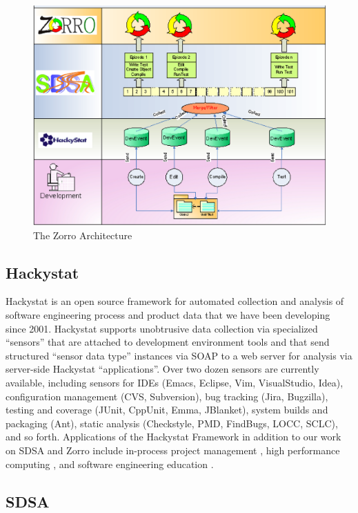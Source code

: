\documentclass[11pt,twocolumn]{article}
\begin{document}
\begin{figure}[th]
  \center
  \includegraphics[width=1.0\textwidth]{zorro-architecture.eps}
  \caption{The Zorro Architecture}
  \label{fig:ZorroArchitecture}
\end{figure} 

\subsection{Hackystat}

Hackystat is an open source framework for automated collection and analysis
of software engineering process and product data that we have been
developing since 2001. Hackystat supports unobtrusive data collection via
specialized ``sensors'' that are attached to development environment tools
and that send structured ``sensor data type'' instances via SOAP to a web
server for analysis via server-side Hackystat ``applications''. Over two
dozen sensors are currently available, including sensors for IDEs (Emacs,
Eclipse, Vim, VisualStudio, Idea), configuration management (CVS,
Subversion), bug tracking (Jira, Bugzilla), testing and coverage (JUnit,
CppUnit, Emma, JBlanket), system builds and packaging (Ant), static
analysis (Checkstyle, PMD, FindBugs, LOCC, SCLC), and so forth.
Applications of the Hackystat Framework in addition to our work on SDSA and
Zorro include in-process project management \cite{csdl2-04-11}, high
performance computing \cite{csdl2-04-22}, and software engineering
education \cite{csdl2-03-12}.

\subsection{SDSA}
\end{document}
